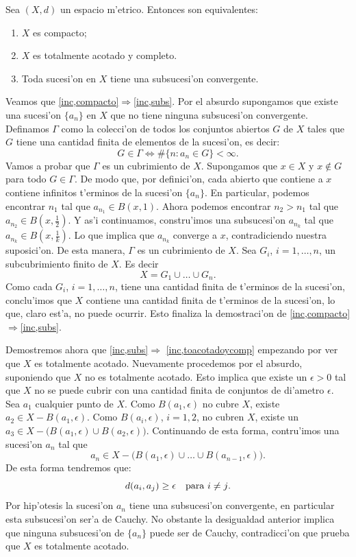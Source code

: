 \begin{teorema}
 Sea $(X,d)$ un  espacio m'etrico. Entonces son
equivalentes:

\begin{enumerate}
\item\label{inc,compacto} $X$ es compacto;
\item\label{inc,toacotadoycomp} $X$ es totalmente acotado y
completo.
\item\label{inc,subs} Toda sucesi'on en $X$ tiene una subsucesi'on
convergente.
\end{enumerate}
\end{teorema}
\begin{demo} Veamos que
\ref{inc,compacto}$\Rightarrow$\ref{inc,subs}. Por el absurdo
supongamos que existe una sucesi'on $\{a_n\}$ en $X$ que no tiene
ninguna subsucesi'on convergente. Definamos $\Gamma$ como la
colecci'on de todos los conjuntos abiertos $G$ de $X$ tales que
$G$ tiene una cantidad finita de elementos de la sucesi'on, es
decir:
\[
G\in\Gamma\Leftrightarrow \#\{n:a_n\in G\}<\infty.
\]
Vamos a probar que $\Gamma$ es un cubrimiento de $X$. Supongamos
que $x\in X$ y $x\notin G$ para todo $G\in\Gamma$. De modo que,
por definici'on, cada abierto que contiene a $x$ contiene
infinitos t'erminos de la sucesi'on $\{a_n\}$. En particular,
podemos encontrar $n_1$ tal que $a_{n_1}\in B(x,1)$. Ahora podemos
encontrar $n_2>n_1$ tal que $a_{n_2}\in B(x,\frac12)$. Y as'i
continuamos, constru'imos una subsucesi'on $a_{n_k}$ tal que
$a_{n_k}\in B(x,\frac1k)$. Lo que implica que $a_{n_k}$ converge a
$x$, contradiciendo nuestra suposici'on. De esta manera,
$\Gamma$ es un cubrimiento de $X$. Sea $G_i$, $i=1,\ldots,n$, un
subcubrimiento finito de $X$. Es decir
\[
	X=G_1\cup\dots\cup G_n.
\]
Como cada $G_i$, $i=1,\ldots,n$, tiene una cantidad finita de
t'erminos de la sucesi'on, conclu'imos que $X$
contiene una cantidad finita de t'erminos de la sucesi'on, lo que,
claro est'a, no puede ocurrir. Esto finaliza la demostraci'on de
\ref{inc,compacto}$\Rightarrow$\ref{inc,subs}.

Demostremos ahora que \ref{inc,subs}$\Rightarrow$
\ref{inc,toacotadoycomp} empezando por ver que $X$ es totalmente
acotado. Nuevamente procedemos por el absurdo, suponiendo que $X$
no es totalmente acotado. Esto implica que existe un $\epsilon>0$
tal que $X$ no se puede cubrir con una cantidad finita de
conjuntos de di'ametro $\epsilon$. Sea $a_1$ cualquier punto de
$X$. Como $B(a_1,\epsilon)$ no cubre $X$, existe $a_2\in
X-B(a_1,\epsilon)$. Como $B(a_i,\epsilon)$, $i=1,2$, no cubren
$X$, existe un $a_3\in X-\bigl(B(a_1,\epsilon)\cup
B(a_2,\epsilon)\bigr)$. Continuando de esta forma, contru'imos una
sucesi'on $a_n$ tal que
\[
	a_n\in X-\big(B(a_1,\epsilon)\cup\dots\cup
	B(a_{n-1},\epsilon)\big).
\]
De esta forma tendremos que:
\[
	d(a_i,a_j)\geq \epsilon\quad\hbox{para $i\neq j$}.
\]
Por hip'otesis la sucesi'on $a_n$ tiene una subsucesi'on convergente,
en particular esta subsucesi'on ser'a  de Cauchy. No obstante la desigualdad
anterior implica que ninguna subsucesi'on de $\{a_n\}$ puede
ser de Cauchy, contradicci'on que prueba que $X$ es totalmente acotado.


\end{demo}

